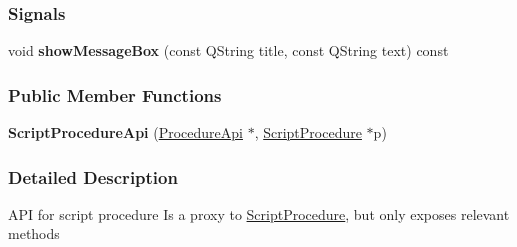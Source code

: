 \subsubsection*{Signals}
\begin{DoxyCompactItemize}
\item
\hypertarget{classapex_1_1_script_procedure_api_a1ed2ba2f813100e7f74e077fbc07ccd1}{void {\bfseries show\-Message\-Box} (const Q\-String title, const Q\-String text) const }\label{classapex_1_1_script_procedure_api_a1ed2ba2f813100e7f74e077fbc07ccd1}

\end{DoxyCompactItemize}
\subsubsection*{Public Member Functions}
\begin{DoxyCompactItemize}
\item
\hypertarget{classapex_1_1_script_procedure_api_a87766833f185c70fde1914a697cd0374}{{\bfseries Script\-Procedure\-Api} (\hyperlink{classapex_1_1_procedure_api}{Procedure\-Api} $\ast$, \hyperlink{classapex_1_1_script_procedure}{Script\-Procedure} $\ast$p)}\label{classapex_1_1_script_procedure_api_a87766833f185c70fde1914a697cd0374}

\end{DoxyCompactItemize}


\subsubsection{Detailed Description}
A\-P\-I for script procedure Is a proxy to \hyperlink{classapex_1_1_script_procedure}{Script\-Procedure}, but only exposes relevant methods

